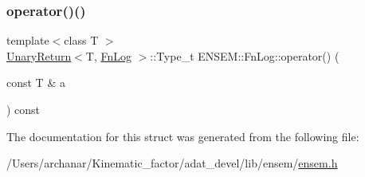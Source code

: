 \mbox{\label{structENSEM_1_1FnLog_a11b3aaca4dd06198708ed986afc66ba7}} 
\subsubsection{\texorpdfstring{operator()()}{operator()()}\hspace{0.1cm}{\footnotesize\ttfamily [2/2]}}
{\footnotesize\ttfamily template$<$class T $>$ \\
\mbox{\hyperlink{structENSEM_1_1UnaryReturn}{Unary\+Return}}$<$T, \mbox{\hyperlink{structENSEM_1_1FnLog}{Fn\+Log}} $>$\+::Type\+\_\+t E\+N\+S\+E\+M\+::\+Fn\+Log\+::operator() (\begin{DoxyParamCaption}\item[{const T \&}]{a }\end{DoxyParamCaption}) const\hspace{0.3cm}{\ttfamily [inline]}}



The documentation for this struct was generated from the following file\+:\begin{DoxyCompactItemize}
\item 
/\+Users/archanar/\+Kinematic\+\_\+factor/adat\+\_\+devel/lib/ensem/\mbox{\hyperlink{lib_2ensem_2ensem_8h}{ensem.\+h}}\end{DoxyCompactItemize}
